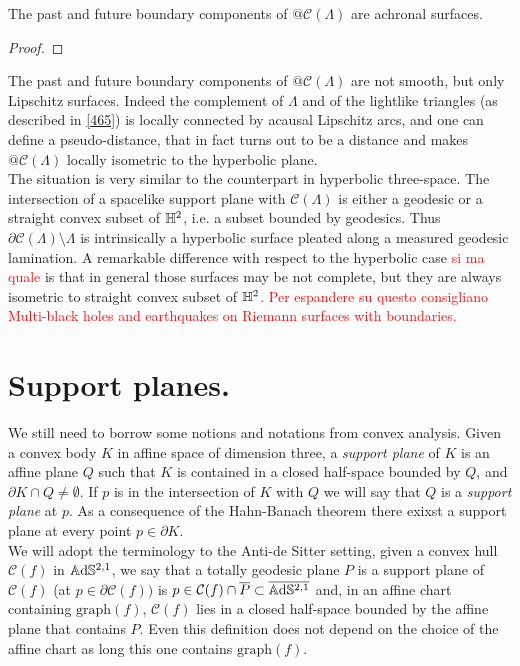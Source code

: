 \begin{proposition}\label{466}
The past and future boundary components of $@\mathcal{C}(\Lambda)$ are achronal surfaces.
\end{proposition}
\begin{proof}
    
\end{proof}

\begin{observation}\label{467}
The past and future boundary components of $@\mathcal{C}(\Lambda)$ are not smooth, but only Lipschitz surfaces. Indeed the complement of $\Lambda$ and of the lightlike triangles (as described in \ref{465}) is locally connected by acausal Lipschitz arcs, and one can define a pseudo-distance, that in fact turns out to be a distance and makes $@\mathcal{C}(\Lambda)$ locally isometric to the hyperbolic plane. \\
The situation is very similar to the counterpart in hyperbolic three-space. The intersection of a spacelike support plane with $\mathcal{C}(\Lambda)$ is either a geodesic or a straight convex subset of $\mathbb{H}^2$, i.e. a subset bounded by geodesics. Thus $\partial\mathcal{C}(\Lambda)\setminus\Lambda$ is intrinsically a hyperbolic surface pleated along a measured geodesic lamination. A remarkable difference with respect to the hyperbolic case \textcolor{red}{si ma quale} is that in general those surfaces may be not complete, but they are always isometric to straight convex subset of $\mathbb{H}^2$. \textcolor{red}{Per espandere su questo consigliano Multi-black holes and earthquakes on Riemann surfaces with boundaries.}

\end{observation}

\section{Support planes.}\label{sectionplanes}
We still need to borrow some notions and notations from convex analysis. Given a convex body $K$ in affine space of dimension three, a \textit{support plane} of $K$ is an affine plane $Q$ such that $K$ is contained in a closed half-space bounded by $Q$, and $\partial K\cap Q\neq\emptyset.$ If $p$ is in the intersection of $K$ with $Q$ we will say that $Q$ is a \textit{support plane} at $p$. As a consequence of the Hahn-Banach theorem there exixst a support plane at every point $p\in\partial K.$ \\
We will adopt the terminology to the Anti-de Sitter setting, given a convex hull $\mathcal{C}(f)$ in $\mathbb{A}\mathrm{d}\mathbb{S}^{2,1}$, we say that a totally geodesic plane $P$ is a support plane of $\mathcal{C}(f)$ (at $p\in\partial\mathcal{C}(f))$ is $p\in\mathcal{C}(f)\cap \overline{P}\subset\overline{\mathbb{A}\mathrm{d}\mathbb{S}^{2,1}}$ and, in an affine chart containing $\text{graph}(f)$, $\mathcal{C}(f)$ lies in a closed half-space bounded by the affine plane that contains $P$. Even this definition does not depend on the choice of the affine chart as long this one contains $\text{graph}(f)$.\\ 

